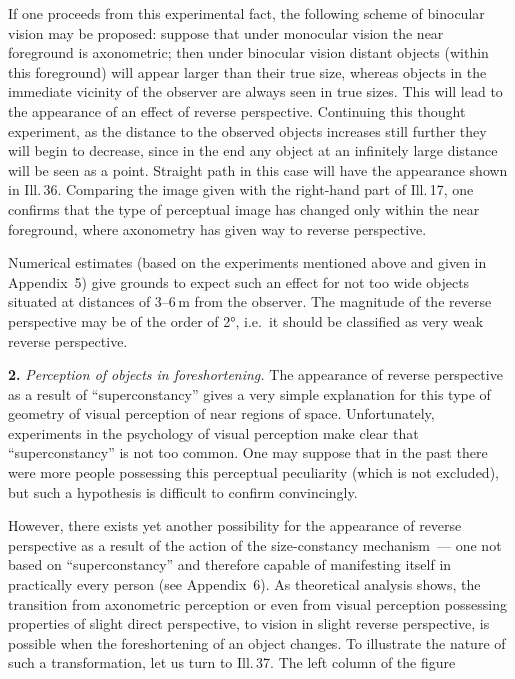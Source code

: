 If one proceeds from this experimental fact, the following scheme of binocular
vision may be proposed: suppose that under monocular vision the near foreground is
axonometric; then under binocular vision distant objects (within this foreground)
will appear larger than their true size, whereas objects in the immediate vicinity of
the observer are always seen in true sizes.  This will lead to the appearance of an
effect of reverse perspective.  Continuing this thought experiment, as the distance
to the observed objects increases still further they will begin to decrease, since
in the end any object at an infinitely large distance will be seen as a point.
Straight path in this case will have the appearance shown in Ill.\,36.  Comparing
the image given with the right-hand part of Ill.\,17, one confirms that the type of
perceptual image has changed only within the near foreground, where axonometry has
given way to reverse perspective.


Numerical estimates (based on the experiments mentioned above and given in
Appendix~5) give grounds to expect such an effect for not too wide objects situated
at distances of 3--6\,m from the observer.  The magnitude of the reverse perspective
may be of the order of 2°, i.e.\ it should be classified as very weak reverse
perspective.

\medskip
\noindent\textbf{2.}\quad
\emph{Perception of objects in foreshortening.}  The appearance of reverse
perspective as a result of ``superconstancy'' gives a very simple explanation for
this type of geometry of visual perception of near regions of space.  Unfortunately,
experiments in the psychology of visual perception make clear that ``superconstancy''
is not too common.  One may suppose that in the past there were more people
possessing this perceptual peculiarity (which is not excluded), but such a hypothesis
is difficult to confirm convincingly.

However, there exists yet another possibility for the appearance of reverse
perspective as a result of the action of the size-constancy mechanism~--- one not
based on ``superconstancy'' and therefore capable of manifesting itself in practically
every person (see Appendix~6).  As theoretical analysis shows, the transition from
axonometric perception or even from visual perception possessing properties of slight
direct perspective, to vision in slight reverse perspective, is possible when the
foreshortening of an object changes.  To illustrate the nature of such a
transformation, let us turn to Ill.\,37.  The left column of the figure

